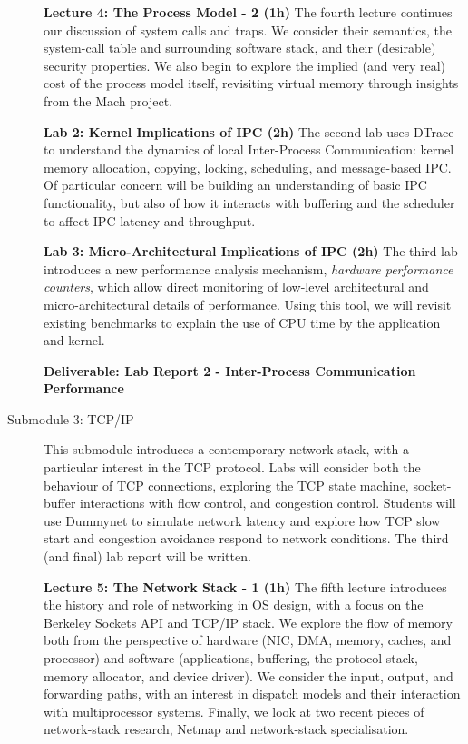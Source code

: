 \documentclass[a4paper,10pt]{article}
\begin{document}
\begin{description}
  \noindent
  \textbf{Lecture 4: The Process Model - 2 (1h)}
  The fourth lecture continues our discussion of system calls and traps.
  We consider their semantics, the system-call table and surrounding software
  stack, and their (desirable) security properties.
  We also begin to explore the implied (and very real) cost of the process
  model itself, revisiting virtual memory through insights from the Mach
  project.

  \noindent
  \textbf{Lab 2: Kernel Implications of IPC (2h)}
  The second lab uses DTrace to understand the dynamics of local
  Inter-Process Communication: kernel memory allocation, copying, locking,
  scheduling, and message-based IPC.
  Of particular concern will be building an understanding of basic IPC
  functionality, but also of how it interacts with buffering and the scheduler
  to affect IPC latency and throughput.

  \noindent
  \textbf{Lab 3: Micro-Architectural Implications of IPC (2h)}
  The third lab introduces a new performance analysis mechanism,
  \textit{hardware performance counters}, which allow direct monitoring of
  low-level architectural and micro-architectural details of performance.
  Using this tool, we will revisit existing benchmarks to explain the use of
  CPU time by the application and kernel.

  \noindent
  \textbf{Deliverable: Lab Report 2 - Inter-Process Communication Performance}

\item[Submodule 3: TCP/IP]
  This submodule introduces a contemporary network stack, with a particular
  interest in the TCP protocol.
  Labs will consider both the behaviour of TCP connections, exploring the TCP
  state machine, socket-buffer interactions with flow control, and congestion
  control.
  Students will use Dummynet to simulate network latency and explore how TCP
  slow start and congestion avoidance respond to network conditions.
  The third (and final) lab report will be written.

  \noindent
  \textbf{Lecture 5: The Network Stack - 1 (1h)}
  The fifth lecture introduces the history and role of networking in OS
  design, with a focus on the Berkeley Sockets API and TCP/IP stack.
  We explore the flow of memory both from the perspective of hardware (NIC,
  DMA, memory, caches, and processor) and software (applications, buffering,
  the protocol stack, memory allocator, and device driver).
  We consider the input, output, and forwarding paths, with an interest in
  dispatch models and their interaction with multiprocessor systems.
  Finally, we look at two recent pieces of network-stack research, Netmap and
  network-stack specialisation.


\end{description}
\end{document}

